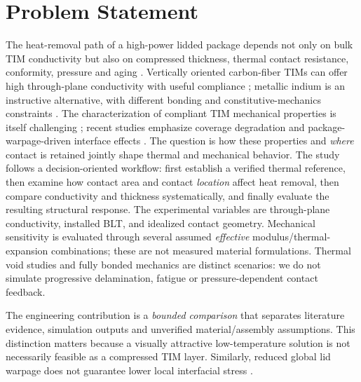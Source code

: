 \documentclass[10pt,a4paper]{article}
\begin{document}
\section{Problem Statement}
The heat-removal path of a high-power lidded package depends not only on bulk TIM conductivity but also
on compressed thickness, thermal contact resistance, conformity, pressure and aging
\citep{prasher2006,due2013,zhao2019}. Vertically oriented carbon-fiber TIMs can offer high through-plane
conductivity with useful compliance \citep{li2023,yi2025}; metallic indium is an instructive alternative,
with different bonding and constitutive-mechanics constraints \citep{wen2026}.
The characterization of compliant TIM mechanical properties is itself challenging \citep{subramanian2019};
recent studies emphasize coverage degradation and package-warpage-driven interface effects
\citep{du2026,yenigun2026}.
The question is how these properties and \emph{where} contact is retained jointly shape thermal and mechanical behavior.
The study follows a decision-oriented workflow: first establish a verified thermal reference, then examine how
contact area and contact \emph{location} affect heat removal, then compare conductivity and thickness
systematically, and finally evaluate the resulting structural response. The experimental variables are
through-plane conductivity, installed BLT, and idealized contact geometry. Mechanical sensitivity is evaluated
through several assumed \emph{effective} modulus/thermal-expansion combinations; these are not
measured material formulations. Thermal void studies and fully bonded mechanics are distinct scenarios:
we do not simulate progressive delamination, fatigue or pressure-dependent contact feedback.

The engineering contribution is a \emph{bounded comparison} that separates literature evidence,
simulation outputs and unverified material/assembly assumptions. This distinction matters because
a visually attractive low-temperature solution is not necessarily feasible as a compressed TIM layer.
Similarly, reduced global lid warpage does not guarantee lower local interfacial stress
\citep{subramanian2019,yenigun2026}.
\end{document}
